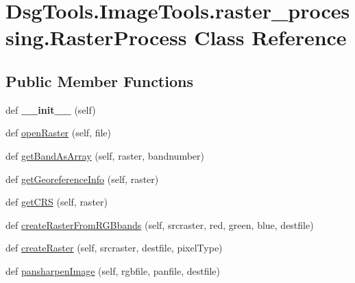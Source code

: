 \hypertarget{class_dsg_tools_1_1_image_tools_1_1raster__processing_1_1_raster_process}{}\section{Dsg\+Tools.\+Image\+Tools.\+raster\+\_\+processing.\+Raster\+Process Class Reference}
\label{class_dsg_tools_1_1_image_tools_1_1raster__processing_1_1_raster_process}
\subsection*{Public Member Functions}
\begin{DoxyCompactItemize}
\item 
\mbox{\label{class_dsg_tools_1_1_image_tools_1_1raster__processing_1_1_raster_process_a986059850e6b1e6ffb282e4ef937da7d}} 
def {\bfseries \+\_\+\+\_\+init\+\_\+\+\_\+} (self)
\item 
def \mbox{\hyperlink{class_dsg_tools_1_1_image_tools_1_1raster__processing_1_1_raster_process_a9efca9cef0b40ad8ca0e4e0b949efc8d}{open\+Raster}} (self, file)
\item 
def \mbox{\hyperlink{class_dsg_tools_1_1_image_tools_1_1raster__processing_1_1_raster_process_a89410abdd251c750c0e13783e9bfbe23}{get\+Band\+As\+Array}} (self, raster, bandnumber)
\item 
def \mbox{\hyperlink{class_dsg_tools_1_1_image_tools_1_1raster__processing_1_1_raster_process_a27bbae0bc866c3f178be14c3f0738d6c}{get\+Georeference\+Info}} (self, raster)
\item 
def \mbox{\hyperlink{class_dsg_tools_1_1_image_tools_1_1raster__processing_1_1_raster_process_aef5604afa2c25b7eef155b0946c44792}{get\+C\+RS}} (self, raster)
\item 
def \mbox{\hyperlink{class_dsg_tools_1_1_image_tools_1_1raster__processing_1_1_raster_process_af334cdc5aa7d11ee74e1cc97b3007abf}{create\+Raster\+From\+R\+G\+Bbands}} (self, srcraster, red, green, blue, destfile)
\item 
def \mbox{\hyperlink{class_dsg_tools_1_1_image_tools_1_1raster__processing_1_1_raster_process_ae0baa21e8ad949a1b32a7b5009cdda5b}{create\+Raster}} (self, srcraster, destfile, pixel\+Type)
\item 
def \mbox{\hyperlink{class_dsg_tools_1_1_image_tools_1_1raster__processing_1_1_raster_process_ab97bd21a7e0e90893917b02be37d8001}{pansharpen\+Image}} (self, rgbfile, panfile, destfile)

\end{DoxyCompactItemize}

